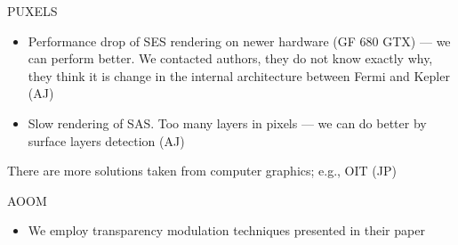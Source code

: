 PUXELS \cite{kauker2013rendering}
\begin{itemize}
  \item Performance drop of SES rendering on newer hardware (GF 680 GTX) --- we can perform better. We contacted authors, they do not know exactly why, they think it is change in the internal architecture between Fermi and Kepler (AJ)
  \item Slow rendering of SAS. Too many layers in pixels --- we can do better by surface layers detection (AJ)
\end{itemize}

There are more solutions taken from computer graphics; e.g., OIT (JP)

AOOM
\begin{itemize}
  \item We employ transparency modulation techniques presented in their paper \cite{borland2011ambient}
\end{itemize}
